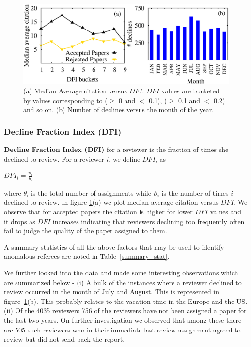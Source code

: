 \begin{figure}
\centering
\includegraphics[scale=0.3]{./texfiles/Chapter_4/cikm/figures/DFI_dec_month.eps}
\caption{\label{fig_dfi}(a) Median Average citation versus $DFI$. $DFI$ values are bucketed by values corresponding to ($\geq$ 0 and $<$ 0.1), ($\geq$ 0.1 and $<$ 0.2) and so on. (b) Number of declines versus the month of the year.}
\end{figure}

\subsubsection{Decline Fraction Index (DFI)}

{\bf Decline Fraction Index (DFI)} for a reviewer is the fraction of times she declined to review. For a reviewer $i$, we define $DFI_{i}$ as
\begin{center}
$DFI_{i}=\frac{\vartheta_{i}}{\theta_{i}}$
\end{center}

\noindent where $\theta_{i}$ is the total number of assignments while $\vartheta_{i}$ is the number of times $i$ declined to review. 
In figure \ref{fig_dfi}(a) we plot median average citation versus $DFI$. We observe that for accepted papers the citation is higher for lower $DFI$ values and it drops as $DFI$ increases indicating that reviewers declining too frequently often fail to judge the quality of the paper assigned to them.

A summary statistics of all the above factors that may be used to identify anomalous referees are noted in Table~\ref{summary_stat}.

We further looked into the data and made some interesting observations which are summarized below - 
(i) A bulk of the instances where a reviewer declined to review occurred in the month of July and August. This is represented in figure~\ref{fig_dfi}(b). This probably relates to the vacation time in the Europe and the US. 
(ii) Of the 4035 reviewers 756 of the reviewers have not been assigned a paper for the last two years. On further investigation we observed that among these there are 505 such reviewers who in their immediate last review assignment agreed to review but did not send back the report. 